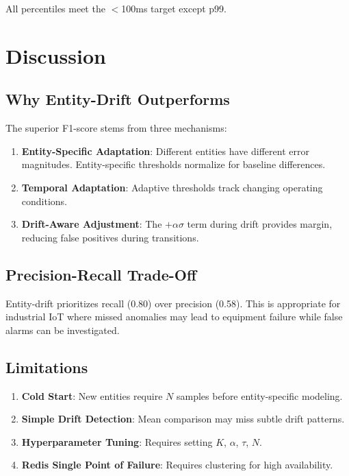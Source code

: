 \documentclass[conference]{IEEEtran}
\begin{document}
All percentiles meet the $<$100ms target except p99.

\section{Discussion}

\subsection{Why Entity-Drift Outperforms}

The superior F1-score stems from three mechanisms:

\begin{enumerate}
\item \textbf{Entity-Specific Adaptation}: Different entities have different error magnitudes. Entity-specific thresholds normalize for baseline differences.

\item \textbf{Temporal Adaptation}: Adaptive thresholds track changing operating conditions.

\item \textbf{Drift-Aware Adjustment}: The $+\alpha\sigma$ term during drift provides margin, reducing false positives during transitions.
\end{enumerate}

\subsection{Precision-Recall Trade-Off}

Entity-drift prioritizes recall (0.80) over precision (0.58). This is appropriate for industrial IoT where missed anomalies may lead to equipment failure while false alarms can be investigated.

\subsection{Limitations}

\begin{enumerate}
\item \textbf{Cold Start}: New entities require $N$ samples before entity-specific modeling.
\item \textbf{Simple Drift Detection}: Mean comparison may miss subtle drift patterns.
\item \textbf{Hyperparameter Tuning}: Requires setting $K$, $\alpha$, $\tau$, $N$.
\item \textbf{Redis Single Point of Failure}: Requires clustering for high availability.
\end{enumerate}
\end{document}
